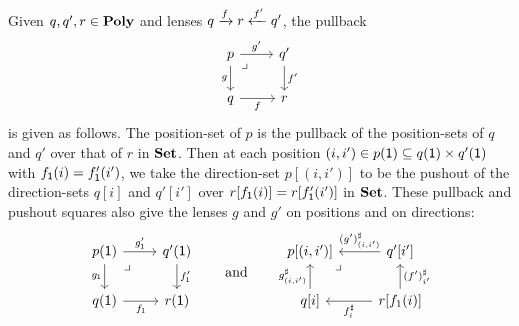 \documentclass[Book-Poly]{subfiles}
\begin{document}
\begin{example}\label{ex.pullbacks_in_poly}
Given $q,q',r \in \mathbf{Poly}$ and lenses $q\xrightarrow{f} r\xleftarrow{f'} q'$, the pullback
\[
\begin{tikzcd}
	p\ar[r, "g'"]\ar[d, "g"']&
	q'\ar[d, "f'"]\\
	q\ar[r, "f"']&
	r\ar[ul, phantom, very near end, "\lrcorner"]
\end{tikzcd}
\]
is given as follows.
The position-set of $p$ is the pullback of the position-sets of $q$ and $q'$ over that of $r$ in $\mathbf{Set}$.
Then at each position $(i, i') \in p(\textsf{1}) \subseteq q(\textsf{1}) \times q'(\textsf{1})$ with $f_{\textsf{1}}(i)=f'_{\textsf{1}}(i')$, we take the direction-set $p[(i, i')]$ to be the pushout of the direction-sets $q[i]$ and $q'[i']$ over $r[f_{\textsf{1}}(i)]=r[f_{\textsf{1}}'(i')]$ in $\mathbf{Set}$.
These pullback and pushout squares also give the lenses $g$ and $g'$ on positions and on directions:
\begin{equation}\label{eqn.pullback_poly}
\begin{tikzcd}
	p(\1)\ar[r, "g'_\1"]\ar[d, "g_\1"']&
	q'(\1)\ar[d, "f_\1'"]\\
	q(\1)\ar[r, "f_\1"']&
	r(\1)\ar[ul, phantom, very near end, "\lrcorner"]
\end{tikzcd}
\qqand
\begin{tikzcd}
	p[(i,i')]\ar[from=r, "(g')^\sharp_{(i,i')}"']\ar[from=d, "g^\sharp_{(i,i')}"]&
	q'[i']\ar[from=d, "(f')^\sharp_{i'}"']\\
	q[i]\ar[from=r, "f^\sharp_i"]&
	r[f_1(i)]\ar[ul, phantom, very near end, "\lrcorner"]
\end{tikzcd}
\end{equation}
\end{example}
\end{document}
